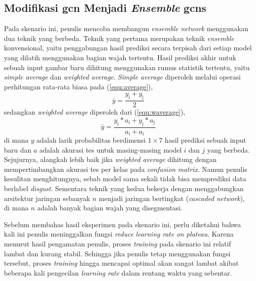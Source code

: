 \subsection{Modifikasi \acrshort{gcn} Menjadi \textit{Ensemble} \acrshort{gcns}}
Pada skenario ini, penulis mencoba membangun \textit{ensemble network} menggunakan dua teknik yang berbeda. Teknik yang pertama merupakan teknik \textit{ensemble} konvensional, yaitu penggabungan hasil prediksi secara terpisah dari setiap model yang dilatih menggunakan bagian wajah tertentu. Hasil prediksi akhir untuk sebuah input gambar baru dihitung menggunakan rumus statistik tertentu, yaitu \textit{simple average} dan \textit{weighted average}. \textit{Simple average} diperoleh melalui operasi perhitungan rata-rata biasa pada (\ref{equ:average}),
\begin{equation}
    \bar{y} = \frac{y_{\text{i}} + y_{\text{j}}}{2}
    \label{equ:average}
\end{equation}
sedangkan \textit{weighted average} diperoleh dari (\ref{equ:waverage}),
\begin{equation}
    \bar{y} = \frac{y_{\text{i}} * a_{\text{i}} + y_{\text{j}} * a_{\text{j}}}{a_{\text{i}} + a_{\text{i}}}
    \label{equ:waverage}
\end{equation}
di mana $y$ adalah larik probabilitas berdimensi $1 \times 7$ hasil prediksi sebuah input baru dan $a$ adalah akurasi tes untuk masing-masing model $i$ dan $j$ yang berbeda. Sejujurnya, alangkah lebih baik jika \textit{weighted average} dihitung dengan mempertimbangkan akurasi tes per kelas pada \textit{confusion matrix}. Namun penulis kesulitan menghitungnya, sebab model sama sekali tidak bisa memprediksi data berlabel \textit{disgust}. Sementara teknik yang kedua bekerja dengan menggabungkan arsitektur jaringan sebanyak $n$ menjadi jaringan bertingkat (\textit{cascaded network}), di mana $n$ adalah banyak bagian wajah yang disegmentasi.

Sebelum membahas hasil eksperimen pada skenario ini, perlu diketahui bahwa kali ini penulis meninggalkan fungsi \textit{reduce learning rate on plateau}. Karena menurut hasil pengamatan penulis, proses \textit{training} pada skenario ini relatif lambat dan kurang stabil. Sehingga jika penulis tetap menggunakan fungsi tersebut, proses \textit{training} hingga mencapai optimal akan sangat lambat akibat beberapa kali pengecilan \textit{learning rate} dalam rentang waktu yang sebentar.

